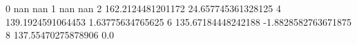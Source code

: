 0 nan nan
1 nan nan
2 162.2124481201172 24.657745361328125
4 139.1924591064453 1.63775634765625
6 135.67184448242188 -1.8828582763671875
8 137.55470275878906 0.0
